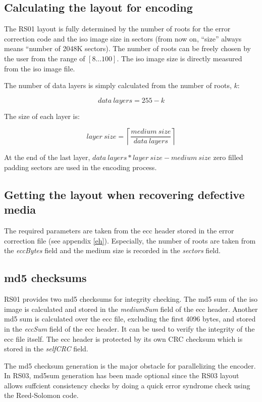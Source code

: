 \subsection{Calculating the layout for encoding}

The RS01 layout is fully determined by the number of roots for the error correction code
and the iso image size in sectors (from now on, ``size'' always means ``number of
2048K sectors). The number of roots can be freely chosen by the user from the
range of $[8...100]$. The iso image size is directly measured
from the iso image file.

\smallskip

The number of data layers is simply calculated from the number of roots, $k$:

\[ data\ layers = 255 - k\]

The size of each layer is:

\[ layer\ size = \left\lceil\frac{medium\ size}{data\ layers}\right\rceil\]

At the end of the last layer, $data\ layers * layer\ size - medium\ size$
zero filled padding sectors are used in the encoding process.

\subsection{Getting the layout when recovering defective media}

The required parameters are taken from the ecc header stored in
the error correction file (see appendix \ref{eh}). Especially,
the number of roots are taken from the {\em eccBytes} field and
the medium size is recorded in the {\em sectors} field.

\subsection{md5 checksums}

RS01 provides two md5 checksums for integrity checking.
The md5 sum of the iso image is calculated and stored in the
{\em mediumSum} field of the ecc header. 
Another md5 sum is calculated over the ecc file, excluding the
first 4096 bytes, and stored in the {\em eccSum} field of
the ecc header. It can be used to verify the integrity of the
ecc file itself. The ecc header is protected by its own CRC
checksum which is stored in the {\em selfCRC} field.

\smallskip

The md5 checksum generation is the major obstacle for parallelizing
the encoder. In RS03, md5sum generation has been made optional since
the RS03 layout allows suffcient consistency checks 
by doing a quick error syndrome check using the Reed-Solomon code.

